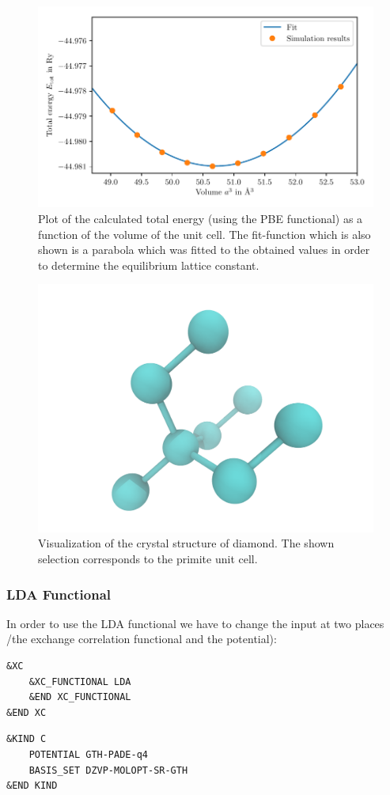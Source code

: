 \documentclass[a4paper,10pt,bibtotoc]{scrartcl}
\begin{document}
\begin{figure}[h]
\centering
 \includegraphics[width=\textwidth]{Figure_lattice_constant_PBE.pdf}
 \caption{Plot of the calculated total energy (using the PBE functional) as a function of the volume of the unit cell. The fit-function which is also shown is a parabola which was fitted to the obtained values in order to determine the equilibrium lattice constant.}
 \label{fig:fig2}
\end{figure}

\begin{figure}[h]
\centering
 \includegraphics[width=\textwidth]{structure.png}
 \caption{Visualization of the crystal structure of diamond. The shown selection corresponds to the primite unit cell.}
 \label{fig:fig3}
\end{figure}

\subsubsection{LDA Functional}
In order to use the LDA functional we have to change the input at two places /the exchange correlation functional and the potential):
\begin{lstlisting}
&XC
    &XC_FUNCTIONAL LDA
    &END XC_FUNCTIONAL
&END XC
\end{lstlisting}
\begin{lstlisting}
&KIND C
    POTENTIAL GTH-PADE-q4
    BASIS_SET DZVP-MOLOPT-SR-GTH
&END KIND
\end{lstlisting}
\end{document}
